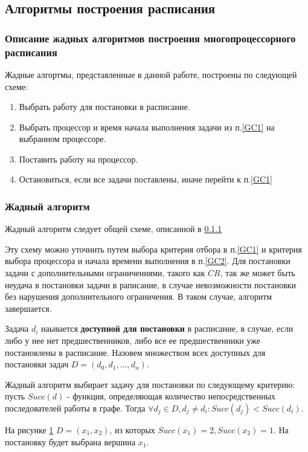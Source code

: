 \subsection{Алгоритмы построения расписания}
\subsubsection{Описание жадных алгоритмов построения многопроцессорного расписания} \label{algo_template}
Жадные алгортмы, представленные в данной работе, построены по следующей схеме:
\begin{enumerate}
    \item \label{GC1} Выбрать работу для постановки в расписание.
    \item \label{GC2} Выбрать процессор и время начала выполнения задачи из п.\ref{GC1} на выбранном процессоре.
    \item Поставить работу на процессор.
    \item Остановиться, если все задачи поставлены, иначе перейти к п.\ref{GC1}
\end{enumerate}

\subsubsection{Жадный алгоритм} \label{Greedy_GC1}
Жадный алгоритм следует общей схеме, описанной в \ref{algo_template}

Эту схему можно уточнить путем выбора критерия отбора в п.\ref{GC1} и критерия выбора процессора и начала времени выполнения в п.\ref{GC2}. Для постановки задачи с дополнительными ограничениями, такого как $CR$, так же может быть неудача в постановки задачи в раписание, в случае невозможности постановки без нарушения дополнительного ограничения. В таком случае, алгоритм завершается.

Задача $d_i$ наывается \textbf{доступной для постановки} в расписание, в случае, если либо у нее нет предшественников, либо все ее предшественники уже постановлены в расписание. Назовем множеством всех доступных для постановки задач $D = \left( d_0, d_1, \ldots, d_n \right)$.

Жадный алгоритм выбирает задачу для постановки по следующему критерию: пусть $Succ(d)$ - функция, определяющая количество непосредственных последователей работы в графе. Тогда $\forall d_j \in D, d_j \neq d_i: Succ(d_j) < Succ(d_i)$.

\begin{figure}[!htbp]
    \caption{}
    \label{fig:max-children}
\end{figure}
На рисунке \ref{fig:max-children} $D = \left( x_1, x_2 \right)$, из которых $Succ(x_1) = 2, Succ(x_2) = 1$. На постановку будет выбрана вершина $x_1$. 

